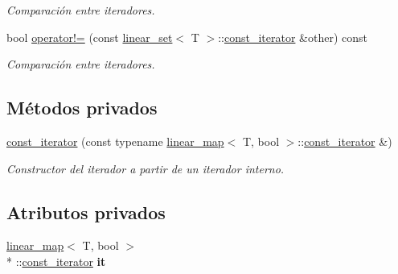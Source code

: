 \begin{DoxyCompactItemize}
\begin{DoxyCompactList}\small\item\em Comparación entre iteradores. \end{DoxyCompactList}\item 
bool \hyperlink{classlinear__set_1_1const__iterator_aaf284dd1decbd51ca0afedb3093da2a7}{operator!=} (const \hyperlink{classlinear__set}{linear\-\_\-set}$<$ T $>$\-::\hyperlink{classlinear__set_1_1const__iterator}{const\-\_\-iterator} \&other) const 
\begin{DoxyCompactList}\small\item\em Comparación entre iteradores. \end{DoxyCompactList}\end{DoxyCompactItemize}
\subsection*{Métodos privados}
\begin{DoxyCompactItemize}
\item 
\hypertarget{classlinear__set_1_1const__iterator_a14bd9ad8205de2c6fab3d8504253ee78}{\hyperlink{classlinear__set_1_1const__iterator_a14bd9ad8205de2c6fab3d8504253ee78}{const\-\_\-iterator} (const typename \hyperlink{classlinear__map}{linear\-\_\-map}$<$ T, bool $>$\-::\hyperlink{classlinear__set_1_1const__iterator}{const\-\_\-iterator} \&)}\label{classlinear__set_1_1const__iterator_a14bd9ad8205de2c6fab3d8504253ee78}

\begin{DoxyCompactList}\small\item\em Constructor del iterador a partir de un iterador interno. \end{DoxyCompactList}\end{DoxyCompactItemize}
\subsection*{Atributos privados}
\begin{DoxyCompactItemize}
\item 
\hypertarget{classlinear__set_1_1const__iterator_a16ef6914efccf16bfcb659df265244f8}{\hyperlink{classlinear__map}{linear\-\_\-map}$<$ T, bool $>$\\*
\-::\hyperlink{classlinear__set_1_1const__iterator}{const\-\_\-iterator} {\bfseries it}}\label{classlinear__set_1_1const__iterator_a16ef6914efccf16bfcb659df265244f8}

\end{DoxyCompactItemize}
